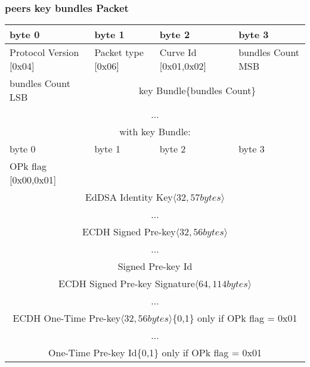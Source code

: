 \documentclass[a4paper,11pt]{article}
\begin{document}
    \subsubsection{peers key bundles Packet}
      \begin{center}
      \begin{tabular}{ | p{1.4in} | p{1.4in} | p{1.4in} | p{1.4in} |}
        \hline
        \cellcolor[gray]{0.85} byte 0 & \cellcolor[gray]{0.85} byte 1 & \cellcolor[gray]{0.85} byte 2 & \cellcolor[gray]{0.85}byte 3\\
        \hline
        Protocol Version [0x04] & Packet type [0x06] & Curve Id [0x01,0x02] & bundles Count MSB\\
        \hline
        bundles Count LSB & \multicolumn{3}{|c|}{key Bundle\{bundles Count\}}\\
        \cline{1-1}
        \multicolumn{4}{|c|}{...}\\
        \hline
        \multicolumn{4}{c}{with key Bundle:}\\
        \hline
        \cellcolor[gray]{0.95} byte 0 & \cellcolor[gray]{0.95} byte 1 & \cellcolor[gray]{0.95} byte 2 & \cellcolor[gray]{0.95}byte 3\\
        \hline
        OPk flag [0x00,0x01] & \multicolumn{3}{|c|}{}\\
        \cline{1-1}
        \multicolumn{4}{|c|}{EdDSA Identity Key$\langle 32,57bytes\rangle $}\\
        \multicolumn{4}{|c|}{...}\\
        \hline
        \multicolumn{4}{|c|}{ECDH Signed Pre-key$\langle 32,56bytes\rangle $}\\
        \multicolumn{4}{|c|}{...}\\
        \hline
        \multicolumn{4}{|c|}{Signed Pre-key Id}\\
        \hline
        \multicolumn{4}{|c|}{ECDH Signed Pre-key Signature$\langle 64,114bytes\rangle $}\\
        \multicolumn{4}{|c|}{...}\\
        \hline
        \multicolumn{4}{|c|}{ECDH One-Time Pre-key$\langle 32,56bytes\rangle $\{0,1\} only if OPk flag = 0x01}\\
        \multicolumn{4}{|c|}{...}\\
        \hline
        \multicolumn{4}{|c|}{One-Time Pre-key Id\{0,1\} only if OPk flag = 0x01}\\
        \hline
      \end{tabular}
      \end{center}
      
\end{document}
